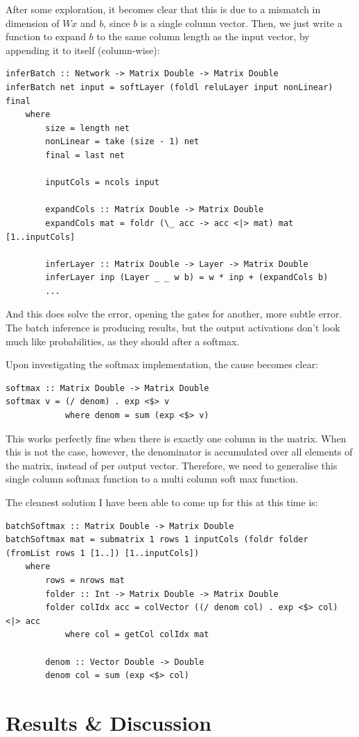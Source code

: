 \documentclass[12pt, titlepage]{article}
\begin{document}
After some exploration, it becomes clear that this is due to a mismatch in dimension of $Wx$ and $b$, since $b$ is a single column vector. Then, we just write a function to expand $b$ to the same column length as the input vector, by appending it to itself (column-wise):
\begin{lstlisting}
inferBatch :: Network -> Matrix Double -> Matrix Double
inferBatch net input = softLayer (foldl reluLayer input nonLinear) final
	where
		size = length net
		nonLinear = take (size - 1) net
		final = last net

		inputCols = ncols input

        expandCols :: Matrix Double -> Matrix Double
        expandCols mat = foldr (\_ acc -> acc <|> mat) mat [1..inputCols]

		inferLayer :: Matrix Double -> Layer -> Matrix Double
		inferLayer inp (Layer _ _ w b) = w * inp + (expandCols b)
		...
\end{lstlisting}
And this does solve the error, opening the gates for another, more subtle error. The batch inference is producing results, but the output activations don't look much like probabilities, as they should after a softmax.\bigskip

Upon investigating the softmax implementation, the cause becomes clear:
\begin{lstlisting}
softmax :: Matrix Double -> Matrix Double
softmax v = (/ denom) . exp <$> v
			where denom = sum (exp <$> v)	
\end{lstlisting}
This works perfectly fine when there is exactly one column in the matrix. When this is not the case, however, the denominator is accumulated over all elements of the matrix, instead of per output vector. Therefore, we need to generalise this single column softmax function to a multi column soft max function.\bigskip

The cleanest solution I have been able to come up for this at this time is:
\begin{lstlisting}
batchSoftmax :: Matrix Double -> Matrix Double
batchSoftmax mat = submatrix 1 rows 1 inputCols (foldr folder (fromList rows 1 [1..]) [1..inputCols])
	where
		rows = nrows mat
		folder :: Int -> Matrix Double -> Matrix Double
		folder colIdx acc = colVector ((/ denom col) . exp <$> col) <|> acc
			where col = getCol colIdx mat

		denom :: Vector Double -> Double
		denom col = sum (exp <$> col)
\end{lstlisting}

\section{Results \& Discussion}
\end{document}
